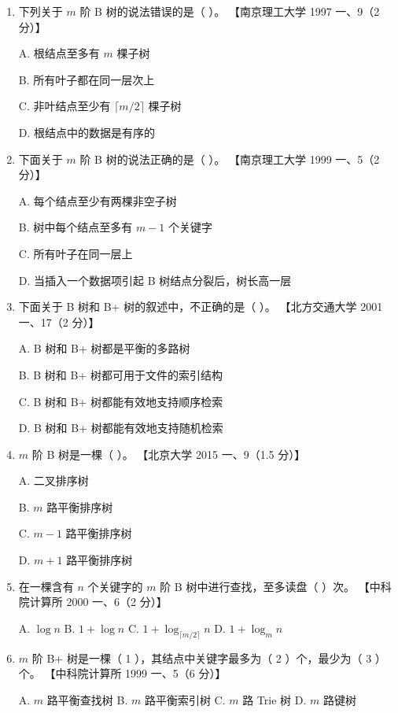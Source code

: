 \documentclass[lang=cn,newtx,10pt,scheme=chinese]{elegantbook}
\begin{document}
\begin{enumerate}
    \item 下列关于 $m$ 阶 B 树的说法错误的是（ ）。  
    【南京理工大学 1997 一、9（2 分）】  

    A. 根结点至多有 $m$ 棵子树  

    B. 所有叶子都在同一层次上  

    C. 非叶结点至少有 $\lceil m/2 \rceil$ 棵子树  

    D. 根结点中的数据是有序的  

    \item 下面关于 $m$ 阶 B 树的说法正确的是（ ）。  
    【南京理工大学 1999 一、5（2 分）】  

    A. 每个结点至少有两棵非空子树  

    B. 树中每个结点至多有 $m-1$ 个关键字  

    C. 所有叶子在同一层上  

    D. 当插入一个数据项引起 B 树结点分裂后，树长高一层  

    \item 下面关于 B 树和 B+ 树的叙述中，不正确的是（ ）。  
    【北方交通大学 2001 一、17（2 分）】  

    A. B 树和 B+ 树都是平衡的多路树  

    B. B 树和 B+ 树都可用于文件的索引结构  

    C. B 树和 B+ 树都能有效地支持顺序检索  


    D. B 树和 B+ 树都能有效地支持随机检索  

    \item $m$ 阶 B 树是一棵（ ）。  
    【北京大学 2015 一、9（1.5 分）】  

    A. 二叉排序树  

    B. $m$ 路平衡排序树  

    C. $m-1$ 路平衡排序树  

    D. $m+1$ 路平衡排序树  

    \item 在一棵含有 $n$ 个关键字的 $m$ 阶 B 树中进行查找，至多读盘（ ）次。  
    【中科院计算所 2000 一、6（2 分）】 

    A. $\log n$ \quad B. $1 + \log n$ \quad C. $1 + \log_{\lceil m/2 \rceil} n$ \quad D. $1 + \log_m n$  

    \item $m$ 阶 B+ 树是一棵（ 1 ），其结点中关键字最多为（ 2 ）个，最少为（ 3 ）个。  
    【中科院计算所 1999 一、5（6 分）】  

    A. $m$ 路平衡查找树 \quad B. $m$ 路平衡索引树 \quad C. $m$ 路 Trie 树 \quad D. $m$ 路键树  


\end{enumerate}
\end{document}
